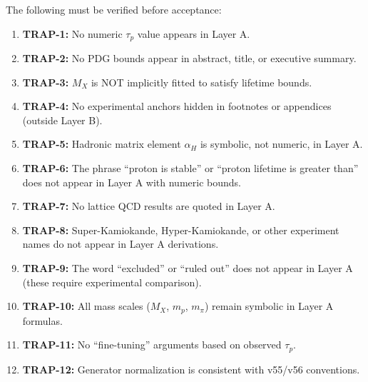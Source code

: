 \documentclass[11pt,a4paper]{article}
\theoremstyle{definition}
\begin{document}
\begin{trapbox}
The following must be verified before acceptance:

\begin{enumerate}
  \item \textbf{TRAP-1:} No numeric $\tau_p$ value appears in Layer A.

  \item \textbf{TRAP-2:} No PDG bounds appear in abstract, title, or executive summary.

  \item \textbf{TRAP-3:} $M_X$ is NOT implicitly fitted to satisfy lifetime bounds.

  \item \textbf{TRAP-4:} No experimental anchors hidden in footnotes or appendices
        (outside Layer B).

  \item \textbf{TRAP-5:} Hadronic matrix element $\alpha_H$ is symbolic, not numeric,
        in Layer A.

  \item \textbf{TRAP-6:} The phrase ``proton is stable'' or ``proton lifetime is
        greater than'' does not appear in Layer A with numeric bounds.

  \item \textbf{TRAP-7:} No lattice QCD results are quoted in Layer A.

  \item \textbf{TRAP-8:} Super-Kamiokande, Hyper-Kamiokande, or other experiment names
        do not appear in Layer A derivations.

  \item \textbf{TRAP-9:} The word ``excluded'' or ``ruled out'' does not appear
        in Layer A (these require experimental comparison).

  \item \textbf{TRAP-10:} All mass scales ($M_X$, $m_p$, $m_\pi$) remain symbolic
        in Layer A formulas.

  \item \textbf{TRAP-11:} No ``fine-tuning'' arguments based on observed $\tau_p$.

  \item \textbf{TRAP-12:} Generator normalization is consistent with v55/v56 conventions.
\end{enumerate}
\end{trapbox}

\end{document}
